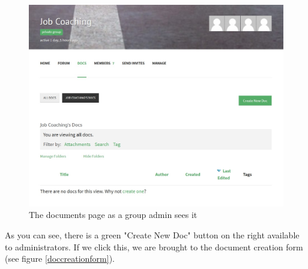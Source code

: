 \documentclass[10pt]{article}
\begin{document}
\begin{figure}[H]
    \centering
    \includegraphics[scale=0.5]{images/docspage.jpg}
    \caption{The documents page as a group admin sees it}
    \label{adminsdocspage}
\end{figure}

\begin{flushleft}
As you can see, there is a green "Create New Doc" button on the right available to administrators. If we click this, we are brought to the document creation form (see figure \ref{doccreationform}).  
\end{flushleft}
\end{document}
